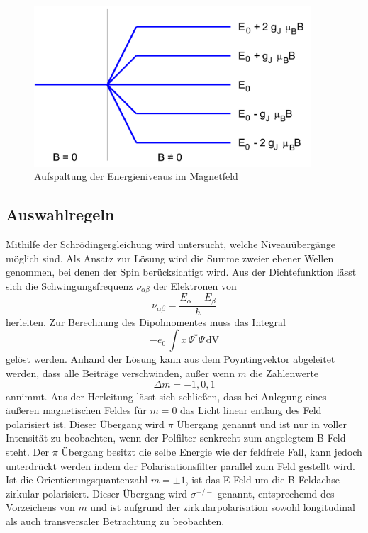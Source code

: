 \begin{figure}
  \centering
  \includegraphics[height=6cm]{./Bilder/ENiveaus.png}
  \caption{Aufspaltung der Energieniveaus im Magnetfeld \cite{V27}}
   \label{fig:Eniv}
\end{figure}

\subsection{Auswahlregeln}
Mithilfe der Schrödingergleichung wird untersucht, welche Niveauübergänge möglich sind. Als Ansatz zur Lösung wird die Summe zweier ebener Wellen genommen, bei denen der Spin berücksichtigt wird. Aus der Dichtefunktion lässt sich die Schwingungsfrequenz $\nu_{\alpha\beta}$ der Elektronen von
\begin{equation}
  \nu_{\alpha\beta}= \frac{E_{\alpha} - E_{\beta}}{\hbar}
  \label{eqn:nu}
\end{equation}
herleiten. Zur Berechnung des Dipolmomentes muss das Integral
\begin{equation}
  -e_0\, \int x \, \Psi^* \Psi \, \text{dV}
  \label{}
\end{equation}
gelöst werden. Anhand der Lösung kann aus dem Poyntingvektor abgeleitet werden, dass alle Beiträge verschwinden, außer wenn $m$ die Zahlenwerte
\begin{equation}
  \Delta m = -1,0,1
\end{equation}
annimmt. Aus der Herleitung lässt sich schließen, dass bei Anlegung eines äußeren magnetischen Feldes für $m = 0$ das Licht linear entlang des Feld polarisiert ist. Dieser Übergang wird $\pi$ Übergang genannt und ist nur in voller Intensität zu beobachten, wenn der Polfilter senkrecht zum angelegtem B-Feld steht. Der $\pi$ Übergang besitzt die selbe Energie wie der feldfreie Fall, kann jedoch unterdrückt werden indem der Polarisationsfilter parallel zum Feld gestellt wird. \\
Ist die Orientierungsquantenzahl $m = \pm 1$, ist das E-Feld um die B-Feldachse zirkular polarisiert. Dieser Übergang wird $\sigma^{+/-}$ genannt, entsprechemd des Vorzeichens von $m$ und ist aufgrund der zirkularpolarisation sowohl longitudinal als auch transversaler Betrachtung zu beobachten.

